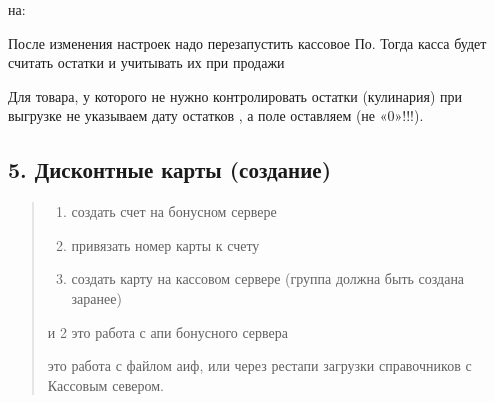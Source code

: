 \documentclass[letterpaper,10pt,russian]{sphinxmanual}
\begin{document}
\begin{sphinxVerbatim}[commandchars=\\\{\}]
  
  
\end{sphinxVerbatim}

\sphinxAtStartPar
на:

\begin{sphinxVerbatim}[commandchars=\\\{\}]
  
  
\end{sphinxVerbatim}

\sphinxAtStartPar
После изменения настроек надо перезапустить кассовое По.
Тогда касса будет считать остатки и учитывать их при продажи

\sphinxAtStartPar
Для товара, у которого не нужно контролировать остатки (кулинария) при выгрузке не указываем дату остатков \sphinxhyphen{} , а поле 
оставляем  (не «0»!!!).


\subsection{5. Дисконтные карты (создание)}
\label{\detokenize{additional:id5}}\begin{quote}
\begin{enumerate}
%
\item {} 
\sphinxAtStartPar
создать счет на бонусном сервере

\item {} 
\sphinxAtStartPar
привязать номер карты к счету

\item {} 
\sphinxAtStartPar
создать карту на кассовом сервере (группа должна быть создана заранее)

\end{enumerate}

 и 2 это работа с апи бонусного сервера

 это работа с файлом аиф, или через рестапи загрузки справочников с Кассовым севером.

\sphinxAtStartPar
{}
\end{quote}
\end{document}
